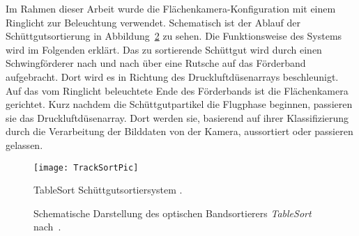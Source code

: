 Im Rahmen dieser Arbeit wurde die Flächenkamera-Konfiguration mit einem Ringlicht zur Beleuchtung verwendet.
Schematisch ist der Ablauf der Schüttgutsortierung in Abbildung~\ref{fig:aufbau_tablesort} zu sehen.
Die Funktionsweise des Systems wird im Folgenden erklärt.
Das zu sortierende Schüttgut wird durch einen Schwingförderer nach und nach über eine Rutsche auf das Förderband aufgebracht.
Dort wird es in Richtung des Druckluftdüsenarrays beschleunigt. 
Auf das vom Ringlicht beleuchtete Ende des Förderbands ist die Flächenkamera gerichtet.
Kurz nachdem die Schüttgutpartikel die Flugphase beginnen, passieren sie das Druckluftdüsenarray.
Dort werden sie, basierend auf ihrer Klassifizierung durch die Verarbeitung der Bilddaten von der Kamera, aussortiert oder passieren gelassen.

\begin{figure}[h]
	\texttt{[image: TrackSortPic]}
	\caption{TableSort Schüttgutsortiersystem \cite{fraunhoferiosb2017}.}
	\label{fig:tablesortsystem}
\end{figure}


\begin{figure}[h]
    \centering
    \def\svgwidth{\columnwidth}
	
	\caption[Schematische Darstellung des \textit{TableSort}-Systems nach~\cite{Pfaff2017}.]{
		Schematische Darstellung des optischen Bandsortierers \textit{TableSort} nach~\cite{Pfaff2017}.
	}
	\label{fig:aufbau_tablesort}

\end{figure}


